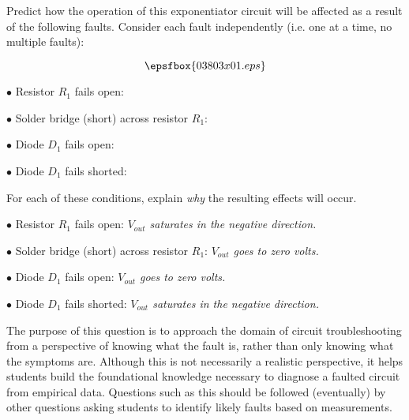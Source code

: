 

Predict how the operation of this exponentiator circuit will be affected as a result of the following faults.  Consider each fault independently (i.e. one at a time, no multiple faults):

$$\epsfbox{03803x01.eps}$$

\medskip
\item{$\bullet$} Resistor $R_1$ fails open:
\vskip 5pt
\item{$\bullet$} Solder bridge (short) across resistor $R_1$:
\vskip 5pt
\item{$\bullet$} Diode $D_1$ fails open:
\vskip 5pt
\item{$\bullet$} Diode $D_1$ fails shorted:
\medskip

For each of these conditions, explain {\it why} the resulting effects will occur.







\medskip
\item{$\bullet$} Resistor $R_1$ fails open: {\it $V_{out}$ saturates in the negative direction.}
\vskip 5pt
\item{$\bullet$} Solder bridge (short) across resistor $R_1$: {\it $V_{out}$ goes to zero volts.}
\vskip 5pt
\item{$\bullet$} Diode $D_1$ fails open: {\it $V_{out}$ goes to zero volts.}
\vskip 5pt
\item{$\bullet$} Diode $D_1$ fails shorted: {\it $V_{out}$ saturates in the negative direction.}
\medskip







The purpose of this question is to approach the domain of circuit troubleshooting from a perspective of knowing what the fault is, rather than only knowing what the symptoms are.  Although this is not necessarily a realistic perspective, it helps students build the foundational knowledge necessary to diagnose a faulted circuit from empirical data.  Questions such as this should be followed (eventually) by other questions asking students to identify likely faults based on measurements.




